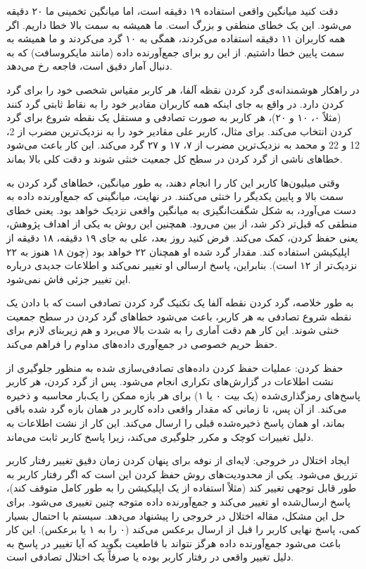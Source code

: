 دقت کنید میانگین واقعی استفاده ۱۹ دقیقه است، اما میانگین تخمینی ما ۲۰ دقیقه می‌شود. این یک خطای منطقی و بزرگ است. ما همیشه به سمت بالا خطا داریم. اگر همه کاربران ۱۱ دقیقه استفاده می‌کردند، همگی به ۱۰ گرد می‌کردند و ما همیشه به سمت پایین خطا داشتیم. از این رو برای جمع‌آورنده داده (مانند مایکروسافت) که به دنبال آمار دقیق است، فاجعه‌ رخ می‌دهد.

در راهکار هوشمندانه‌ی گرد کردن نقظه آلفا، هر کاربر مقیاس شخصی خود را برای گرد کردن دارد. در واقع به جای اینکه همه کاربران مقادیر خود را به نقاط ثابتی گرد کنند (مثلاً ۰، ۱۰ و ۲۰)، هر کاربر به صورت تصادفی و مستقل یک نقطه شروع برای گرد کردن انتخاب می‌کند. برای مثال، کاربر علی مقادیر خود را به نزدیک‌ترین مضرب از {2، 12 و 22} و  محمد به نزدیک‌ترین مضرب از {۷، ۱۷ و ۲۷} گرد می‌کند. این کار باعث می‌شود خطاهای ناشی از گرد کردن در سطح کل جمعیت خنثی شوند و دقت کلی بالا بماند.

وقتی میلیون‌ها کاربر این کار را انجام دهند، به طور میانگین، خطاهای گرد کردن به سمت بالا و پایین یکدیگر را خنثی می‌کنند. در نهایت، میانگینی که جمع‌آورنده داده به دست می‌آورد، به شکل شگفت‌انگیزی به میانگین واقعی نزدیک خواهد بود. یعنی خطای منطقی که قبل‌تر ذکر شد، از بین می‌رود. همچنین این روش به یکی از اهداف پژوهش، یعنی حفظ کردن، کمک می‌کند. فرض کنید روز بعد، علی به جای ۱۹ دقیقه، ۱۸ دقیقه از اپلیکیشن استفاده کند. مقدار گرد شده او همچنان ۲۲ خواهد بود (چون ۱۸ هنوز به ۲۲ نزدیک‌تر از ۱۲ است). بنابراین، پاسخ ارسالی او تغییر نمی‌کند و اطلاعات جدیدی درباره این تغییر جزئی فاش نمی‌شود.

به طور خلاصه، گرد کردن نقطه آلفا یک تکنیک گرد کردن تصادفی است که با دادن یک نقطه شروع تصادفی به هر کاربر، باعث می‌شود خطاهای گرد کردن در سطح جمعیت خنثی شوند. این کار هم دقت آماری را به شدت بالا می‌برد و هم زیربنای لازم برای حفظ حریم خصوصی در جمع‌آوری داده‌های مداوم را فراهم می‌کند.

 حفظ کردن: عملیات حفظ کردن داده‌های تصادفی‌سازی شده به منظور جلوگیری از نشت اطلاعات در گزارش‌های تکراری انجام می‌شود. پس از گرد کردن، هر کاربر پاسخ‌های رمزگذاری‌شده (یک بیت ۰ یا ۱) برای هر بازه ممکن را یک‌بار محاسبه و ذخیره می‌کند. از آن پس، تا زمانی که مقدار واقعی داده کاربر در همان بازه گرد شده باقی بماند، او همان پاسخ ذخیره‌شده قبلی را ارسال می‌کند. این کار از نشت اطلاعات به دلیل تغییرات کوچک و مکرر جلوگیری می‌کند، زیرا پاسخ کاربر ثابت می‌ماند.

 ایجاد اختلال در خروجی: لایه‌ای از نوفه برای پنهان کردن زمان دقیق تغییر رفتار کاربر تزریق می‌شود. یکی از محدودیت‌های روش حفظ کردن این است که اگر رفتار کاربر به طور قابل توجهی تغییر کند (مثلاً استفاده از یک اپلیکیشن را به طور کامل متوقف کند)، پاسخ ارسال‌شده او تغییر می‌کند و جمع‌آورنده داده متوجه چنین تغییری می‌شود. برای حل این مشکل، مقاله اختلال در خروجی را پیشنهاد می‌دهد. سیستم با احتمال بسیار کمی، پاسخ نهایی کاربر را قبل از ارسال برعکس می‌کند (۰ را به ۱ یا برعکس). این کار باعث می‌شود جمع‌آورنده داده هرگز نتواند با قاطعیت بگوید که آیا تغییر در پاسخ به دلیل تغییر واقعی در رفتار کاربر بوده یا صرفاً یک اختلال تصادفی است.

